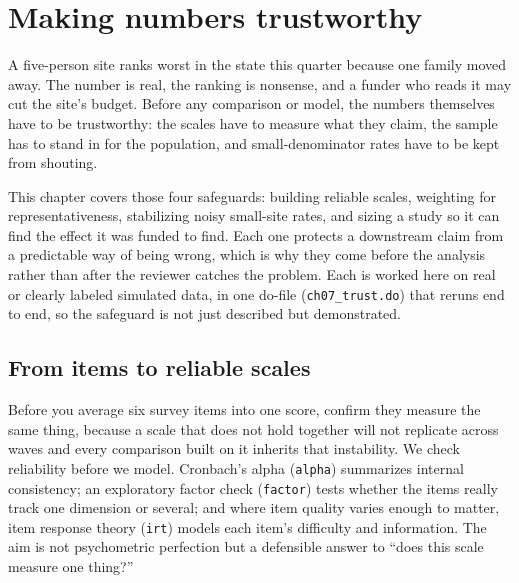 \documentclass[
    a4paper,
    fontsize=10pt,
    twoside=true,
    numbers=noenddot,
]{kaobook}
\begin{document}

\chapter{Making numbers trustworthy}\label{ch:trust}

A five-person site ranks worst in the state this quarter because one family moved away. The number is real, the ranking is nonsense, and a funder who reads it may cut the site's budget. Before any comparison or model, the numbers themselves have to be trustworthy: the scales have to measure what they claim, the sample has to stand in for the population, and small-denominator rates have to be kept from shouting.

This chapter covers those four safeguards: building reliable scales, weighting for representativeness, stabilizing noisy small-site rates, and sizing a study so it can find the effect it was funded to find. Each one protects a downstream claim from a predictable way of being wrong, which is why they come before the analysis rather than after the reviewer catches the problem. Each is worked here on real or clearly labeled simulated data, in one do-file (\texttt{ch07\_trust.do}) that reruns end to end, so the safeguard is not just described but demonstrated.

\section{From items to reliable scales}
Before you average six survey items into one score, confirm they measure the same thing, because a scale that does not hold together will not replicate across waves and every comparison built on it inherits that instability. We check reliability before we model. Cronbach's alpha (\texttt{alpha}) summarizes internal consistency; an exploratory factor check (\texttt{factor}) tests whether the items really track one dimension or several; and where item quality varies enough to matter, item response theory (\texttt{irt}) models each item's difficulty and information. The aim is not psychometric perfection but a defensible answer to \enquote{does this scale measure one thing?}
\end{document}
